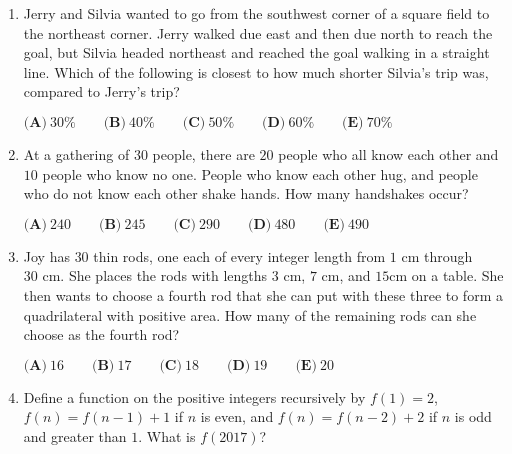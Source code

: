 \documentclass{article}
\begin{document}
\begin{enumerate}[label=\arabic*., itemsep=0.5em]
\( \textbf{(A)}\ \text{ If Lewis did not receive an A, then he got all of the multiple choice questions wrong.} \\ \qquad\textbf{(B)}\ \text{ If Lewis did not receive an A, then he got at least one of the multiple choice questions wrong.} \\ \qquad\textbf{(C)}\ \text{ If Lewis got at least one of the multiple choice questions wrong, then he did not receive an A.} \\ \qquad\textbf{(D)}\ \text{ If Lewis received an A, then he got all of the multiple choice questions right.} \\ \qquad\textbf{(E)}\ \text{ If Lewis received an A, then he got at least one of the multiple choice questions right.} \)\par \vspace{0.5em}\item Jerry and Silvia wanted to go from the southwest corner of a square field to the northeast corner. Jerry walked due east and then due north to reach the goal, but Silvia headed northeast and reached the goal walking in a straight line. Which of the following is closest to how much shorter Silvia's trip was, compared to Jerry's trip?

\(\textbf{(A)}\ 30\%\qquad\textbf{(B)}\ 40\%\qquad\textbf{(C)}\ 50\%\qquad\textbf{(D)}\ 60\%\qquad\textbf{(E)}\ 70\%\)\par \vspace{0.5em}\item At a gathering of \(30\) people, there are \(20\) people who all know each other and \(10\) people who know no one. People who know each other hug, and people who do not know each other shake hands. How many handshakes occur?

\(\textbf{(A)}\ 240\qquad\textbf{(B)}\ 245\qquad\textbf{(C)}\ 290\qquad\textbf{(D)}\ 480\qquad\textbf{(E)}\ 490\)\par \vspace{0.5em}\item Joy has \(30\) thin rods, one each of every integer length from \(1 \text{ cm}\) through \(30 \text{ cm}\). She places the rods with lengths \(3 \text{ cm}\), \(7 \text{ cm}\), and \(15 \text{cm}\) on a table. She then wants to choose a fourth rod that she can put with these three to form a quadrilateral with positive area. How many of the remaining rods can she choose as the fourth rod?

\(\textbf{(A)}\ 16 \qquad\textbf{(B)}\ 17 \qquad\textbf{(C)}\ 18 \qquad\textbf{(D)}\ 19  \qquad\textbf{(E)}\ 20\)\par \vspace{0.5em}\item Define a function on the positive integers recursively by \(f(1) = 2\), \(f(n) = f(n-1) + 1\) if \(n\) is even, and \(f(n) = f(n-2) + 2\) if \(n\) is odd and greater than \(1\). What is \(f(2017)\)?


\end{enumerate}
\end{document}
